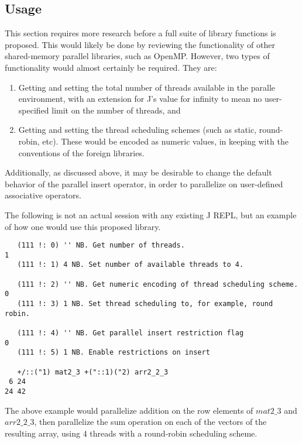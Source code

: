 \subsection{Usage}
This section requires more research before a full suite of library functions is proposed.
This would likely be done by reviewing the functionality of other shared-memory parallel libraries, such as OpenMP. %
However, two types of functionality would almost certainly be required.
They are:

\begin{enumerate}
    \item Getting and setting the total number of threads available in the paralle environment,
        with an extension for J's value for infinity to mean no user-specified limit on the number of threads, and
    \item Getting and setting the thread scheduling schemes (such as static, round-robin, etc).
        These would be encoded as numeric values, in keeping with the conventions of the foreign libraries.
\end{enumerate}

Additionally, as discussed above, it may be desirable to change 
the default behavior of the parallel insert operator, 
in order to parallelize on user-defined associative operators.

The following is not an actual session with any existing J REPL, 
but an example of how one would use this proposed library.

\begin{singlespacing}
\begin{small}
\begin{verbatim}
   (111 !: 0) '' NB. Get number of threads.
1
   (111 !: 1) 4 NB. Set number of available threads to 4.

   (111 !: 2) '' NB. Get numeric encoding of thread scheduling scheme.
0
   (111 !: 3) 1 NB. Set thread scheduling to, for example, round robin.

   (111 !: 4) '' NB. Get parallel insert restriction flag
0
   (111 !: 5) 1 NB. Enable restrictions on insert

   +/::("1) mat2_3 +("::1)("2) arr2_2_3
 6 24
24 42
\end{verbatim}
\end{small}
\end{singlespacing}

The above example would parallelize addition on the row elements of $mat2\_3$ and $arr2\_2\_3$,
then parallelize the sum operation on each of the vectors of the resulting array, 
using 4 threads with a round-robin scheduling scheme.
